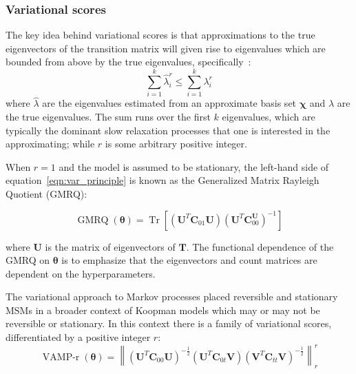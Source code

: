 \documentclass[journal=jacsat,manuscript=article]{achemso}
\begin{document}
\subsubsection{Variational scores}

The key idea behind variational scores is that  approximations to the true eigenvectors of the transition matrix will given rise to eigenvalues which are bounded from above by the true eigenvalues, specifically~\cite{mcgibbonVariationalCrossvalidationSlow2015, wuVariationalApproachLearning2020c}: 
\begin{equation}\label{eqn:var_principle}
    \sum_{i=1}^{k}\hat{\lambda}_{i}^{r} \leq \sum_{i=1}^{k}\lambda_{i}^{r}
\end{equation}
where $\hat{\lambda}$ are the eigenvalues estimated from an approximate basis set $\bm{\chi}$ and $\lambda$ are the true eigenvalues. The sum runs over the first $k$ eigenvalues, which are typically the dominant slow relaxation processes that one is interested in the approximating; while $r$ is some arbitrary positive integer\cite{wuVariationalApproachLearning2020c}.

When $r=1$ and the model is assumed to be stationary\cite{mcgibbonVariationalCrossvalidationSlow2015}, the left-hand side of equation~\ref{eqn:var_principle} is known as the Generalized Matrix Rayleigh Quotient (GMRQ):

\begin{equation}
    \operatorname{GMRQ}(\bm{\theta}) = \operatorname{Tr}\left[(\mathbf{U}^{T}\mathbf{C}_{01}\mathbf{U})(\mathbf{U}^{T}\mathbf{C}_{00}^\mathbf{U})^{-1}\right]
\end{equation}\label{eqn:gmrq}

where $\mathbf{U}$ is the matrix of eigenvectors of $\mathbf{T}$. The functional dependence of the GMRQ on $\bm{\theta}$ is to emphasize that the eigenvectors and count matrices are dependent on the hyperparameters. 

The variational approach to Markov processes placed reversible and stationary MSMs in a broader context of Koopman models which may or may not be reversible or stationary.  In this context there is a family of variational scores, differentiated by a positive integer $r$: 
\begin{equation}
     \operatorname{VAMP-r}(\bm{\theta}) = \left \| (\mathbf{U}^{T}\mathbf{C}_{00}\mathbf{U})^{-\frac{1}{2}}(\mathbf{U}^{T}\mathbf{C}_{0t}\mathbf{V})(\mathbf{V}^{T}\mathbf{C}_{tt}\mathbf{V})^{-\frac{1}{2}} \right \|_{r}^{r}
\end{equation}\label{eqn:vamp_score_def}
\end{document}
